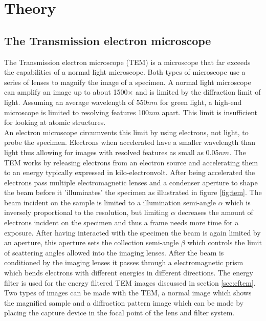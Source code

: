 \section{Theory}
\label{chap:theory}
\subsection{The Transmission electron microscope}
The Transmission electron microscope (TEM) is a microscope that far exceeds the capabilities of a normal light microscope. Both types of microscope use a series of lenses to magnify the image of a specimen.
A normal light microscope can amplify an image up to about 1500$\times$ and is limited by the diffraction limit of light. Assuming an average wavelength of 550$nm$ for green light, a high-end microscope is limited to resolving features 100$nm$ apart.
This limit is insufficient for looking at atomic structures.\cite{PhysRevLett.106.193905}\\
An electron microscope circumvents this limit by using electrons, not light, to probe the specimen. Electrons when accelerated have a smaller wavelength than light thus allowing for images with resolved features as small as 0.05$nm$. \cite{kisielowski_freitag_bischoff_van,Batson2002,Scherzer1949}
The TEM works by releasing electrons from an electron source and accelerating them to an energy typically expressed in kilo-electronvolt. After being accelerated the electrons pass multiple electromagnetic lenses and a condenser aperture to shape the beam before it 'illuminates' the specimen as illustrated in figure \ref{fig:tem}.
The beam incident on the sample is limited to a illumination semi-angle $\alpha$ which is inversely proportional to the resolution, but limiting $\alpha$ decreases the amount of electrons incident on the specimen and thus a frame needs more time for a exposure.
After having interacted with the specimen the beam is again limited by an aperture, this aperture sets the collection semi-angle $\beta$ which controls the limit of scattering angles allowed into the imaging lenses.
After the beam is conditioned by the imaging lenses it passes through a electromagnetic prism which bends electrons with different energies in different directions.
The energy filter is used for the energy filtered TEM images discussed in section \ref{sec:eftem}.\\
Two types of images can be made with the TEM, a normal image which shows the magnified sample and a diffraction pattern image which can be made by placing the capture device in the focal point of the lens and filter system.
